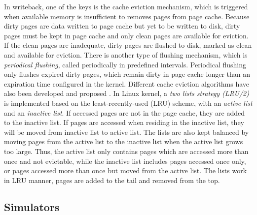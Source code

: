 \documentclass[conference]{IEEEtran}
\begin{document}
            In writeback, one of the keys is the cache eviction mechanism, which is
            triggered when available memory is insufficient to removes pages 
            from page cache. 
            Because dirty pages are data written to page cache but yet to be 
            written to disk, dirty pages must be kept in page cache and only clean pages 
            are available for eviction.
            If the clean pages are inadequate, dirty pages are flushed to disk, 
            marked as clean and available for eviction. 
            There is another type of flushing mechanism, which is 
            \textit{periodical flushing}, called periodically in predefined intervals. 
            Periodical flushing only flushes expired dirty pages, which remain dirty in 
            page cache longer than an expiration time configured in the kernel. 
            Different cache eviction algorithms have also been developed and proposed
            \cite{owda2014comparison}.
            In Linux kernel, a \textit{two lists strategy (LRU/2)} is implemented based on 
            the least-recently-used (LRU) scheme, with an \textit{active list} and 
            an \textit{inactive list}. 
            If accessed pages are not in the page cache, they are added to the inactive list. 
            If pages are accessed when residing in the inactive list, they will be moved from 
            inactive list to active list. 
            The lists are also kept balanced by moving pages from the active list
            to the inactive list when the active list grows too large.
            Thus, the active list only contains pages which are accessed more than once 
            and not evictable, while the inactive list includes pages accessed once only, 
            or pages accessed more than once but moved from the active list. 
            The lists work in LRU manner, pages are added to the tail and removed 
            from the top. 
             
        \subsection{Simulators}
            
\end{document}

